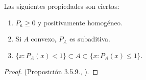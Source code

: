 \begin{proposition}
  Las siguientes propiedades son ciertas:
  \begin{enumerate}
    \item $P_a\ge 0$ y positivamente homogéneo.
    \item Si $A$ convexo, $P_A$ es subaditiva.
    \item $\{x:P_A(x)<1\} \subset A \subset \{x:P_A(x)\le 1\}  $.
  \end{enumerate}
\end{proposition}

\begin{proof}
  (Proposición 3.5.9., \cite{cascales2012}).
\end{proof}


